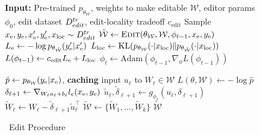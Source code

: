 \begin{figure}
\begin{minipage}[t]{0.45\textwidth}
\begin{algorithm}[H]
\small
\caption{\name~Training}\label{alg:training}
\begin{algorithmic}[1]
\State \textbf{Input:} Pre-trained $p_{\theta_\mathcal{W}}$, weights to make editable $\mathcal{W}$, editor params $\phi_0$, edit dataset $D^{tr}_{edit}$, edit-locality tradeoff $c_\text{edit}$
    \State Sample $x_\text{e},y_\text{e},x_\text{e}',y_\text{e}',x_\text{loc}\sim D^{tr}_{edit}$
    \State $\mathcal{\tilde W} \gets \textsc{Edit}(\theta_\mathcal{W},\mathcal{W},\phi_{t-1},x_\text{e},y_\text{e})$
    \State $L_\text{e} \gets -\log p_{\theta_\mathcal{\tilde W}}(y_\text{e}'|x_\text{e}')$
    \State $L_\text{loc} \gets \text{KL}(p_{\theta_\mathcal{W}}(\cdot|x_\text{loc}) \| p_{\theta_\mathcal{\tilde W}}(\cdot|x_\text{loc}))$
    \State $L(\phi_{t-1}) \gets c_\text{edit} L_\text{e} + L_\text{loc}$
    \State $\phi_t \gets \text{Adam}\left(\phi_{t-1}, \nabla_\phi L(\phi_{t-1})\right)$
\EndFor
\end{algorithmic}\end{algorithm}\end{minipage} \hfill%
%
%
%
\begin{minipage}[t]{0.54\textwidth}
\begin{algorithm}[H]
\small
\caption{\name~Edit Procedure}\label{alg:edit-procedure}
\begin{algorithmic}[1]
    \State $\hat{p} \gets p_{\theta_\mathcal{W}}(y_\text{e}|x_\text{e})$, \textbf{caching} input $u_\ell$ to $W_\ell\in\mathcal{W}$
    \State $L(\theta, \mathcal{W})\gets -\log \hat{p}$ 
        \State $\delta_{\ell+1} \gets \nabla_{W_\ell u_\ell + b_\ell} l_e(x_\text{e},y_\text{e})$ 
        \State $\tilde u_\ell,\tilde\delta_{\ell+1} \gets g_{\phi_\ell}(u_\ell,\delta_{\ell+1})$ 
        \State $\tilde W_\ell \gets W_\ell - \tilde\delta_{\ell+1}\tilde u_\ell^{\top}$ 
    \EndFor
    \State $\mathcal{\tilde{W}} \gets \{\tilde W_1,...,\tilde W_k\}$
    \State \Return $\mathcal{\tilde{W}}$ 
\EndProcedure
\end{algorithmic}\end{algorithm}\end{minipage}
\end{figure}